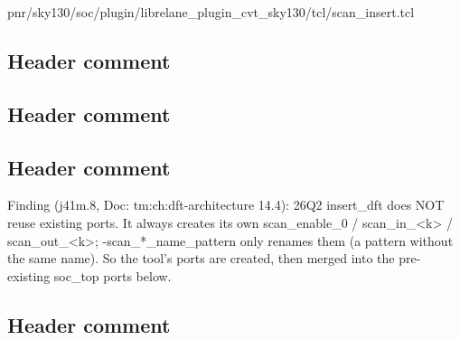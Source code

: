 \begin{relocated}{pnr/sky130/soc/plugin/librelane_plugin_cvt_sky130/tcl/scan_insert.tcl}

\subsection*{Header comment}

\begin{textblock}

\end{textblock}

\subsection*{Header comment}

\begin{textblock}

\end{textblock}

\subsection*{Header comment}

\begin{textblock}

Finding (j41m.8, Doc: tm:ch:dft-architecture 14.4): 26Q2 insert_dft does NOT reuse existing ports.  It always creates its own
scan_enable_0 / scan_in_<k> / scan_out_<k>; -scan_*_name_pattern only renames them (a pattern without %
the same name).  So the tool's ports are created, then merged into the pre-existing soc_top ports below.
\end{textblock}

\subsection*{Header comment}


\end{relocated}
